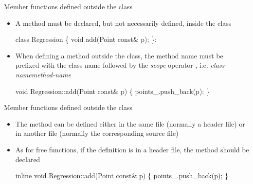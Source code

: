 \begin{frame}[fragile]{Member functions defined outside the class}

  \begin{itemize}

  \item A method must be declared, but not necessarily defined, inside the class

    \begin{codeblock}
class Regression \{
  \ddd
  void add(Point const& p);
  \ddd
\};\end{codeblock}

  \item When defining a method outside the class, the method name must be
    prefixed with the class name followed by the \textit{scope} operator
    \code{::}, i.e. \textit{class-name}\code{::}\textit{method-name}

    \begin{codeblock}
void Regression::add(Point const& p) \{
  points_.push_back(p);
\}\end{codeblock}

  \end{itemize}

\end{frame}

\begin{frame}[fragile]{Member functions defined outside the class \insertcontinuationtext}

  \begin{itemize}
  \item The method can be defined either in the same file (normally a header
    file) or in another file (normally the corresponding source file)

  \item As for free functions, if the definition is in a header file,
    the method should be declared 

    \begin{codeblock}
\alert{inline} void Regression::add(Point const& p) \{
  points_.push_back(p);
\}\end{codeblock}

  \end{itemize}

\end{frame}


